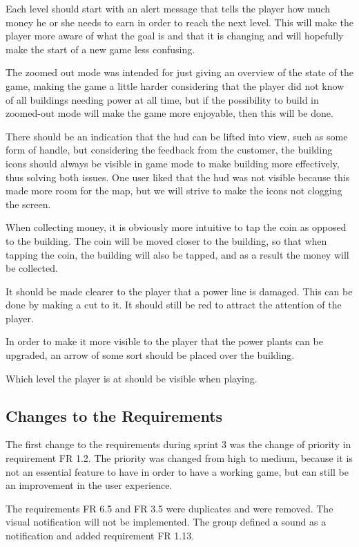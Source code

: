 	Each level should start with an alert message that tells the player how much money he or she needs to earn in order to reach the next level. This will make the player more aware of what the goal is and that it is changing and will hopefully make the start of a new game less confusing.

	The zoomed out mode was intended for just giving an overview of the state of the game, making the game a little harder considering that the player did not know of all buildings needing power at all time, but if the possibility to build in zoomed-out mode will make the game more enjoyable, then this will be done.

	There should be an indication that the hud can be lifted into view, such as some form of handle, but considering the feedback from the customer, the building icons should always be visible in game mode to make building more effectively, thus solving both issues. One user liked that the hud was not visible because this made more room for the map, but we will strive to make the icons not clogging the screen.

	When collecting money, it is obviously more intuitive to tap the coin as opposed to the building. The coin will be moved closer to the building, so that when tapping the coin, the building will also be tapped, and as a result the money will be collected.

	It should be made clearer to the player that a power line is damaged. This can be done by making a cut to it. It should still be red to attract the attention of the player.

	In order to make it more visible to the player that the power plants can be upgraded, an arrow of some sort should be placed over the building.

	Which level the player is at should be visible when playing.

\subsection{Changes to the Requirements}

	The first change to the requirements during sprint 3 was the change of priority in requirement FR 1.2. The priority was changed from high to medium, because it is not an essential feature to have in order to have a working game, but can still be an improvement in the user experience.

	The requirements FR 6.5 and FR 3.5 were duplicates and were removed. The visual notification will not be implemented. The group defined a sound as a notification and added requirement FR 1.13.

